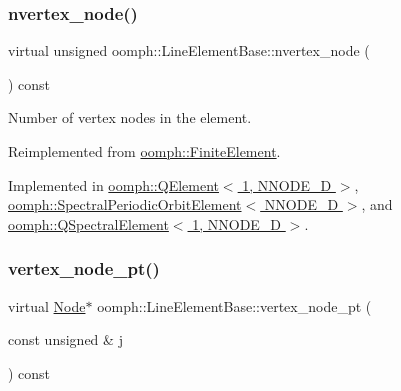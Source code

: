\subsubsection{\texorpdfstring{nvertex\+\_\+node()}{nvertex\_node()}}
{\footnotesize\ttfamily virtual unsigned oomph\+::\+Line\+Element\+Base\+::nvertex\+\_\+node (\begin{DoxyParamCaption}{ }\end{DoxyParamCaption}) const\hspace{0.3cm}{\ttfamily [pure virtual]}}



Number of vertex nodes in the element. 



Reimplemented from \hyperlink{classoomph_1_1FiniteElement_a45631a7aa50efc3123a921d114f84cba}{oomph\+::\+Finite\+Element}.



Implemented in \hyperlink{classoomph_1_1QElement_3_011_00_01NNODE__1D_01_4_a751317144972c615b0a7ef7b1340b692}{oomph\+::\+Q\+Element$<$ 1, N\+N\+O\+D\+E\+\_\+D $>$}, \hyperlink{classoomph_1_1SpectralPeriodicOrbitElement_a3ec38d16dfb22d1e7090b230db3479d5}{oomph\+::\+Spectral\+Periodic\+Orbit\+Element$<$ N\+N\+O\+D\+E\+\_\+D $>$}, and \hyperlink{classoomph_1_1QSpectralElement_3_011_00_01NNODE__1D_01_4_afbc5b62a126b6fcce8fffcd0a4b37b86}{oomph\+::\+Q\+Spectral\+Element$<$ 1, N\+N\+O\+D\+E\+\_\+D $>$}.

\mbox{\label{classoomph_1_1LineElementBase_ab878e4c4276da4cefa4302cff8a7e6f8}} 
\subsubsection{\texorpdfstring{vertex\+\_\+node\+\_\+pt()}{vertex\_node\_pt()}}
{\footnotesize\ttfamily virtual \hyperlink{classoomph_1_1Node}{Node}$\ast$ oomph\+::\+Line\+Element\+Base\+::vertex\+\_\+node\+\_\+pt (\begin{DoxyParamCaption}\item[{const unsigned \&}]{j }\end{DoxyParamCaption}) const\hspace{0.3cm}{\ttfamily [pure virtual]}}



